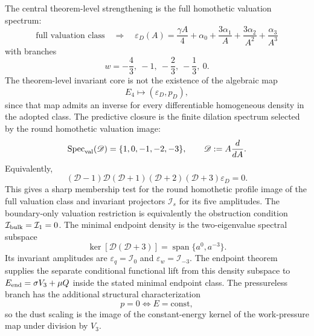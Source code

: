 \documentclass[11pt,a4paper]{article}
\def\dd{d}%
\numberwithin{equation}{section}
\theoremstyle{remark}
\newcommand{\Dil}{\mathscr{D}}
\newcommand{\Efour}{E_4}
\newcommand{\epsD}{\varepsilon_D}
\newcommand{\pD}{p_D}
\newcommand{\dd}{\mathrm{d}}
\begin{document}
The central theorem-level strengthening is the full homothetic valuation spectrum:
\begin{equation}
\boxed{
\text{full valuation class}
\quad\Rightarrow\quad
\epsD(A)=
\frac{\gamma A}{4}
+\alpha_0+\frac{3\alpha_1}{A}
+\frac{3\alpha_2}{A^2}
+\frac{\alpha_3}{A^3}
}
\end{equation}
with branches
\begin{equation}
w=-\frac{4}{3},\ -1,\ -\frac{2}{3},\ -\frac{1}{3},\ 0.
\end{equation}
The theorem-level invariant core is not the existence of the algebraic map
\begin{equation}
\Efour\longmapsto(\epsD,\pD),
\end{equation}
since that map admits an inverse for every differentiable homogeneous density in the adopted class. The predictive closure is the finite dilation spectrum selected by the round homothetic valuation image:
\begin{equation}
\operatorname{Spec}_{\rm val}(\Dil)=\{1,0,-1,-2,-3\},
\qquad
\Dil:=A\frac{\dd}{\dd A}.
\end{equation}
Equivalently,
\begin{equation}
\boxed{
(\Dil-1)\Dil(\Dil+1)(\Dil+2)(\Dil+3)\epsD=0.
}
\end{equation}
This gives a sharp membership test for the round homothetic profile image of the full valuation class and invariant projectors \(\mathcal I_s\) for its five amplitudes. The boundary-only valuation restriction is equivalently the obstruction condition \(\mathcal I_{\rm bulk}=\mathcal I_1=0\). The minimal endpoint density is the two-eigenvalue spectral subspace
\begin{equation}
\boxed{
\ker[\Dil(\Dil+3)]
=\operatorname{span}\{a^0,a^{-3}\}.
}
\end{equation}
Its invariant amplitudes are \(\varepsilon_q=\mathcal I_0\) and \(\varepsilon_w=\mathcal I_{-3}\). The endpoint theorem supplies the separate conditional functional lift from this density subspace to \(E_{\rm end}=\sigma V_3+\mu Q\) inside the stated minimal endpoint class. The pressureless branch has the additional structural characterization
\begin{equation}
p=0\iff E=\mathrm{const},
\end{equation}
so the dust scaling is the image of the constant-energy kernel of the work-pressure map under division by \(V_3\).
\end{document}
